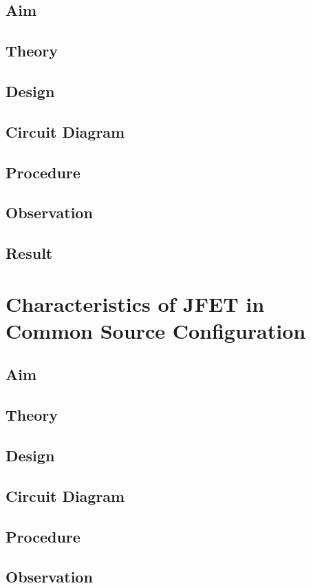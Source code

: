 \documentclass{book}
\begin{document}
\section*{Aim}
\section*{Theory}
\section*{Design}
\section*{Circuit Diagram}
\section*{Procedure}
\section*{Observation}
\section*{Result}
\chapter[Characteristics of JFET in Common Source Configuration]{Characteristics of JFET in Common Source Configuration}
\section*{Aim}
\section*{Theory}
\section*{Design}
\section*{Circuit Diagram}
\section*{Procedure}
\section*{Observation}
\end{document}
